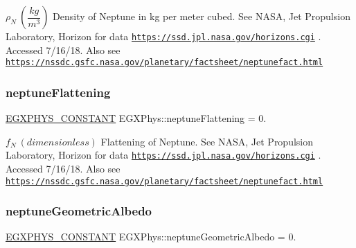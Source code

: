 $\rho_{N} \ (\dfrac{kg}{m^3})$ Density of Neptune in kg per meter cubed. See N\+A\+SA, Jet Propulsion Laboratory, Horizon for data \href{https://ssd.jpl.nasa.gov/horizons.cgi}{\tt https\+://ssd.\+jpl.\+nasa.\+gov/horizons.\+cgi} . Accessed 7/16/18. Also see \href{https://nssdc.gsfc.nasa.gov/planetary/factsheet/neptunefact.html}{\tt https\+://nssdc.\+gsfc.\+nasa.\+gov/planetary/factsheet/neptunefact.\+html} \mbox{\label{group___e_g_x_phys-_constants-_astrophysics-_solar_system-_neptune-_bulk_ga07b9e82e448a3684fe75dd7f5ef07fc0}} 
\subsubsection{\texorpdfstring{neptune\+Flattening}{neptuneFlattening}}
{\footnotesize\ttfamily \mbox{\hyperlink{group___e_g_x_phys-_constants-_macros_ga76980d288494ce1714c9ac68a95ba702}{E\+G\+X\+P\+H\+Y\+S\+\_\+\+C\+O\+N\+S\+T\+A\+NT}} E\+G\+X\+Phys\+::neptune\+Flattening = 0.}

$f_{N} \ (dimensionless)$ Flattening of Neptune. See N\+A\+SA, Jet Propulsion Laboratory, Horizon for data \href{https://ssd.jpl.nasa.gov/horizons.cgi}{\tt https\+://ssd.\+jpl.\+nasa.\+gov/horizons.\+cgi} . Accessed 7/16/18. Also see \href{https://nssdc.gsfc.nasa.gov/planetary/factsheet/neptunefact.html}{\tt https\+://nssdc.\+gsfc.\+nasa.\+gov/planetary/factsheet/neptunefact.\+html} \mbox{\label{group___e_g_x_phys-_constants-_astrophysics-_solar_system-_neptune-_bulk_ga40aef34cd230780558c50d4bec88339d}} 
\subsubsection{\texorpdfstring{neptune\+Geometric\+Albedo}{neptuneGeometricAlbedo}}
{\footnotesize\ttfamily \mbox{\hyperlink{group___e_g_x_phys-_constants-_macros_ga76980d288494ce1714c9ac68a95ba702}{E\+G\+X\+P\+H\+Y\+S\+\_\+\+C\+O\+N\+S\+T\+A\+NT}} E\+G\+X\+Phys\+::neptune\+Geometric\+Albedo = 0.}

